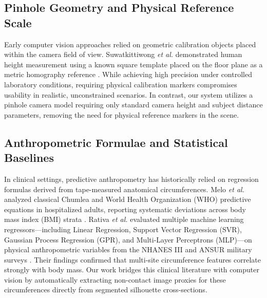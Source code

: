 \documentclass[conference]{IEEEtran}
\begin{document}
\subsection{Pinhole Geometry and Physical Reference Scale}
Early computer vision approaches relied on geometric calibration objects placed within the camera field of view. Suwatkittiwong \textit{et al.} demonstrated human height measurement using a known square template placed on the floor plane as a metric homography reference \cite{suwat2018}. While achieving high precision under controlled laboratory conditions, requiring physical calibration markers compromises usability in realistic, unconstrained scenarios. In contrast, our system utilizes a pinhole camera model requiring only standard camera height and subject distance parameters, removing the need for physical reference markers in the scene.

\subsection{Anthropometric Formulae and Statistical Baselines}
In clinical settings, predictive anthropometry has historically relied on regression formulas derived from tape-measured anatomical circumferences. Melo \textit{et al.} analyzed classical Chumlea and World Health Organization (WHO) predictive equations in hospitalized adults, reporting systematic deviations across body mass index (BMI) strata \cite{melo2014}. Rativa \textit{et al.} evaluated multiple machine learning regressors---including Linear Regression, Support Vector Regression (SVR), Gaussian Process Regression (GPR), and Multi-Layer Perceptrons (MLP)---on physical anthropometric variables from the NHANES III and ANSUR military surveys \cite{rativa2018}. Their findings confirmed that multi-site circumference features correlate strongly with body mass. Our work bridges this clinical literature with computer vision by automatically extracting non-contact image proxies for these circumferences directly from segmented silhouette cross-sections.
\end{document}
